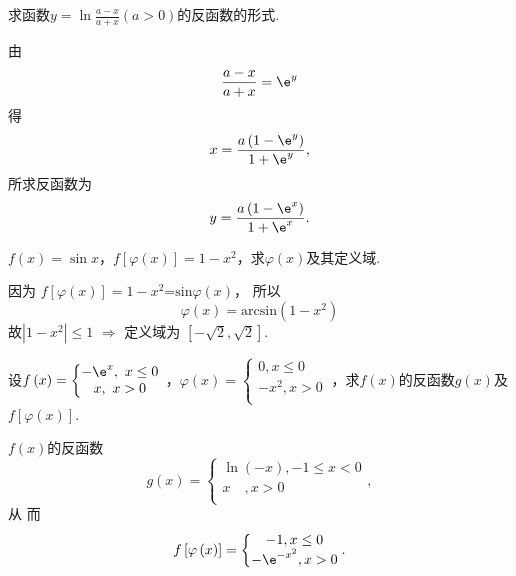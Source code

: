 	\begin{problem}求函数$\displaystyle y = \ln\frac{a - x}{a + x}\left( a > 0 \right)$的反函数的形式.
		
		\begin{solution} 由$$\frac{a - x}{a + x} = \e^{y}$$
			得$$x = \frac{a\left( 1 - \e^{y} \right)}{1 + \e^{y}},$$所求反函数为 $$y = \frac{a\left( 1 - \e^{x} \right)}{1 + \e^{x}}.$$
\end{solution}
\end{problem}
			
\begin{problem}$f\left( x \right) = \sin x$，$f\left\lbrack \varphi\left( x \right) \right\rbrack = 1 - x^{2}$，求$\varphi\left( x \right)$及其定义域.			

\begin{solution}
因为
$ f\left\lbrack \varphi\left( x \right) \right\rbrack = 1 - x^{2}\text{=sin}\varphi\left( x \right)$，
所以
$$\varphi\left( x \right) = \text{arcsin}\left( 1 - x^{2} \right)$$
故$\left| 1 - x^{2} \right| \leq 1$ $\Rightarrow$ 定义域为
$\left\lbrack - \sqrt{2},\sqrt{2} \right\rbrack$.
\end{solution}   
\end{problem}
		
		
\begin{problem}设$f\left( x \right) = \left\{ \begin{matrix}
				-\e^{x}, \ x \leq 0 \\
				x, \ x > 0 \\
				\end{matrix} \right.\ $，$\varphi\left( x \right) = \left\{ \begin{matrix}
				0, x \leq 0 \\
				-x^{2}, x > 0 \\
				\end{matrix} \right.\ $，求$f\left( x \right)$的反函数$g\left( x \right)$及$f\left\lbrack \varphi\left( x \right) \right\rbrack$.
				
				\begin{solution} $f\left( x \right)$的反函数
					$$g\left( x \right) = \left\{ \begin{matrix}
					\ln\left( - x \right), - 1 \leq x < 0 \\
					x\quad,x > 0 \\
					\end{matrix} \right. , $$
					从
					而
					$$f\left\lbrack \varphi\left( x \right) \right\rbrack = \left\{ \begin{matrix}
					-1, x \leq 0 \\
					-\e^{- x^{2}}, x > 0 \\
					\end{matrix} \right. .$$
			\end{solution}   
\end{problem}
		
